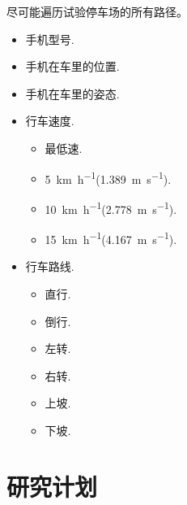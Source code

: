 \documentclass{beamer} %
\begin{document}
\begin{frame}{}
    尽可能遍历试验停车场的所有路径。
    \begin{itemize}
        \item 手机型号.
        \item 手机在车里的位置.
        \item 手机在车里的姿态.
        \item 行车速度.
        \begin{itemize}
            \item 最低速.
            \item \qty{5}{\km\per\hour}(\qty{1.389}{\m\per\second}).
            \item \qty{10}{\km\per\hour}(\qty{2.778}{\m\per\second}).
            \item \qty{15}{\km\per\hour}(\qty{4.167}{\m\per\second}).
        \end{itemize}
        \item 行车路线.
        \begin{itemize}
            \item 直行.
            \item 倒行.
            \item 左转.
            \item 右转.
            \item 上坡.
            \item 下坡.
        \end{itemize}
    \end{itemize}
\end{frame}

\begin{frame}{}
    
\end{frame}




\section{研究计划}
\end{document}

